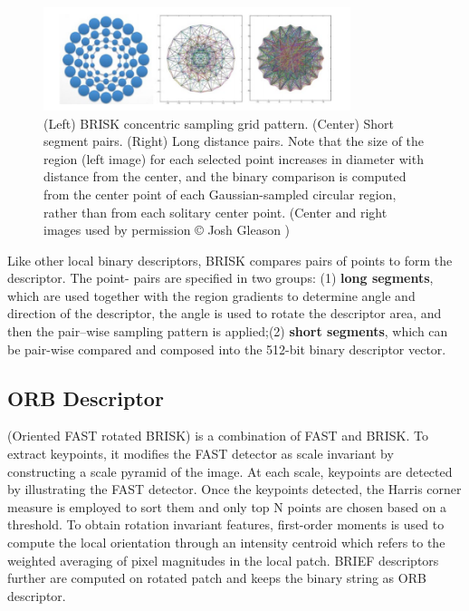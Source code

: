 \begin{figure}[H]
\centering
\includegraphics[width=0.8\textwidth]{img/brisk.PNG}
\caption{ (Left) BRISK concentric sampling grid pattern. (Center) Short segment pairs.
(Right) Long distance pairs. Note that the size of the region (left image) for each selected
point increases in diameter with distance from the center, and the binary comparison is
computed from the center point of each Gaussian-sampled circular region, rather than
from each solitary center point. (Center and right images used by permission © Josh
Gleason \cite{AAA}) }
\label{fig:brisk}
\end{figure}


Like other local binary descriptors, BRISK compares pairs of points to form the
descriptor. The point- pairs are specified in two groups: (1) \textbf{long segments}, which are used
together with the region gradients to determine angle and direction of the descriptor,
the angle is used to rotate the descriptor area, and then the pair–wise sampling pattern is
applied;(2) \textbf{short segments}, which can be pair-wise compared and composed into the
512-bit binary descriptor vector.
\subsection{ORB Descriptor }
(Oriented FAST rotated BRISK) is a 
combination of FAST and BRISK. To extract keypoints, it
modifies the FAST detector as scale invariant by constructing a
scale pyramid of the image. At each scale, keypoints are detected
by illustrating the FAST detector. Once the keypoints detected,
the Harris corner measure is employed to sort them and only top
N points are chosen based on a threshold. To obtain rotation
invariant features, first-order moments is used to compute the
local orientation through an intensity centroid which refers to the
weighted averaging of pixel magnitudes in the local patch.
BRIEF descriptors further are computed on rotated patch and
keeps the binary string as ORB descriptor.


